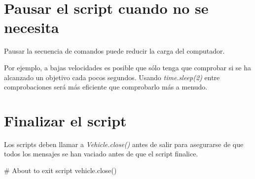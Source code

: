 \section{Pausar el script cuando no se necesita}

Pausar la secuencia de comandos puede reducir la carga del computador.

Por ejemplo, a bajas velocidades es posible que sólo tenga que comprobar si se ha alcanzado un objetivo cada pocos segundos. Usando \textit{time.sleep(2)} entre comprobaciones será más eficiente que comprobarlo más a menudo.

\section{Finalizar el script}

Los scripts deben llamar a \textit{Vehicle.close()} antes de salir para asegurarse de que todos los mensajes se han vaciado antes de que el script finalice.

\begin{listing}[
 float=h!,
 language = Python,
 caption = {Cerrar la conexión con el vehículo},
 label  = code:cerrarvehiculo]
# About to exit script
vehicle.close()
\end{listing}
